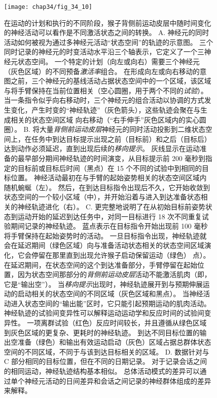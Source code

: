 \begin{figure}[htbp]
	\centering
	\texttt{[image: chap34/fig\_34\_10]}
	\caption{在运动的计划和执行的不同阶段，猴子背侧前运动皮层中随时间变化的神经活动可以看作是不同激活状态之间的转换。
		A. 神经元的同时活动如何被视为通过多神经元活动“状态空间”的轨迹的示意图。
		三个同时记录的神经元的时变活动水平沿三个轴表示，它定义了一个三神经元状态空间。
		一个特定的计划（向左或向右）需要三个神经元（灰色区域）的不同预备\textit{激活率}组合。
		在形成向左或向右移动的意图之前，三个神经元的基线活动占据状态空间中的一个区域，该区域与将手臂保持在当前位置相关（空心圆圈，用于两个不同的\textit{试验}）。
		当一条指令似乎向右移动时，三个神经元的组合活动以协调的方式发生变化，产生时变的“神经轨迹”（灰色箭头），这些轨迹会聚在与生成相关的状态空间区域 向右移动（“右手伸手”灰色区域内的实心圆圈）。
		B. 将大量\textit{背侧前运动皮层}神经元的同时活动投影到二维状态空间上，在任务中到达目标提示出现之前（目标前）和之后（目标后） 达到动作必须延迟，直到出现后续的\textit{移向提示}。
		灰线显示在运动准备的最早部分期间神经轨迹的时间演变，从目标提示前 200 毫秒到指定的目标前或目标后时间（黑点）在 15 个不同的试验中到相同的目标位置。
		神经活动最初在与手臂的起始姿势相关的状态空间区域内随机蜿蜒（左）。
		然后，在到达目标指令出现后不久，它开始收敛到状态空间的一个较小区域（中），并开始沿着与进入到达准备状态相关的神经轨迹进化（右）。
		C. 更完整地说明了在从初始目标前姿势状态到运动开始的延迟到达任务中，对同一目标进行 18 次不同重复试验期间记录的神经轨迹。
		蓝点表示在目标指令开始出现前 100 毫秒将手臂保持在起始姿势时的活动。
		一旦目标指令出现，神经轨迹就会在延迟期间（绿色区域）向与准备活动状态相关的状态空间区域演化，它会停留在那里直到出现允许猴子启动保留运动（绿色） 点）。
		在延迟期间，在状态空间的这个到达准备部分，手臂停留在起始位置，因为状态空间那部分的\textit{背侧前运动皮层}活动不能激活肌肉（即，它是“输出空”）。
		当\textit{移向提示}出现时，神经轨迹展开到与预期伸展运动的启动相关的状态空间的不同区域（灰色区域和黑点）。
		当神经活动进入状态空间的“输出能”区时，它只能引起预期运动的肌肉活动。
		神经轨迹的试验间变异性可以解释运动运动学和反应时间的试验间变异性。
		一项离群试验（红色）反应时间较长，并且遵循从绿色区域到灰色区域的更复杂、更耗时的神经轨迹。
		到达不同目标位置的输出空准备（绿色）和输出有效运动启动（灰色）区域占据总群体状态空间的不同区域，不同于与该到达目标相关的区域。
		D. 数据针对与 C 部分相同的目标位置，但在不同的日期记录。
		对于记录会话之间的相同运动，神经轨迹结构基本相似。
		总体活动模式的差异可以通过单个神经元活动的日间差异和会话之间记录的神经群体组成的差异来解释。}
	\label{fig:34_10}
\end{figure}



